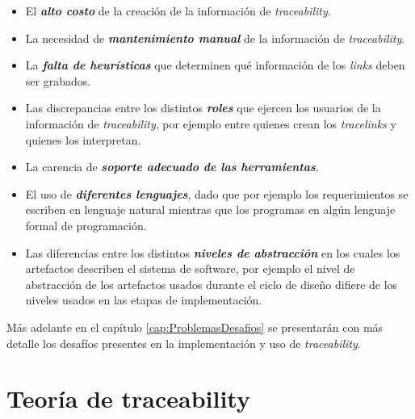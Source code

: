 \documentclass[a4paper,12pt,twoside,spanish,openright]{book}
\begin{document}
\begin{itemize}

\item El \textit{\textbf{alto costo}} de la creación de la información de \textit{traceability}.

\item La necesidad de \textit{\textbf{mantenimiento manual}} de la información de \textit{traceability}.

\item La \textit{\textbf{falta de heurísticas}} que determinen qué información de los \textit{links} deben ser grabados.

\item Las discrepancias entre los distintos \textit{\textbf{roles}} que ejercen los usuarios de la información de \textit{traceability}, por ejemplo entre quienes crean los \textit{tracelinks} y quienes los interpretan.

\item La carencia de \textit{\textbf{soporte adecuado de las herramientas}}.

\item El uso de \textit{\textbf{diferentes lenguajes}}, dado que por ejemplo los requerimientos se escriben en lenguaje natural mientras que los programas en algún lenguaje formal de programación.

\item Las diferencias entre los distintos \textit{\textbf{niveles de abstracción}} en los cuales los artefactos describen el sistema de software, por ejemplo el nivel de abstracción de los artefactos usados durante el ciclo de diseño difiere de los niveles usados en las etapas de implementación.

\end{itemize}

Más adelante en el capítulo \ref{cap:ProblemasDesafios} se presentarán con más detalle los desafíos presentes en la implementación y uso de \textit{traceability}.



\chapter{Teoría de traceability}
\end{document}
